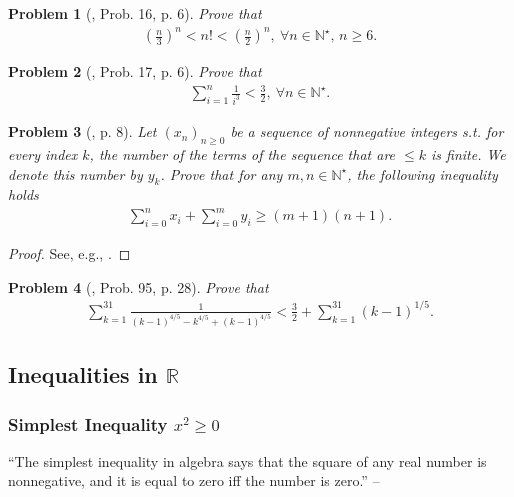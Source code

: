 \documentclass[oneside]{book}
\numberwithin{equation}{section}
\newtheorem{problem}{Problem}[section]
\begin{document}
\begin{problem}[\cite{Gelca_Andreescu2017}, Prob. 16, p. 6]
	Prove that
	\begin{align*}
		\left(\frac{n}{3}\right)^n < n! < \left(\frac{n}{2}\right)^n,\ \forall n\in\mathbb{N}^\star,\,n\ge 6.
	\end{align*}
\end{problem}

\begin{problem}[\cite{Gelca_Andreescu2017}, Prob. 17, p. 6]
	Prove that
	\begin{align*}
		\sum_{i=1}^n \frac{1}{i^3} < \frac{3}{2},\ \forall n\in\mathbb{N}^\star.
	\end{align*}
\end{problem}

\begin{problem}[\cite{Gelca_Andreescu2017}, p. 8]
	Let $(x_n)_{n\ge 0}$ be a sequence of nonnegative integers s.t. for every index $k$, the number of the terms of the sequence that are $\le k$ is finite. We denote this number by $y_k$. Prove that for any $m,n\in\mathbb{N}^\star$, the following inequality holds
	\begin{align*}
		\sum_{i=0}^n x_i + \sum_{i=0}^m y_i\ge(m + 1)(n + 1).
	\end{align*}
\end{problem}

\begin{proof}[Proof]
	See, e.g., \cite[pp. 8--9]{Gelca_Andreescu2017}.
\end{proof}

\begin{problem}[\cite{Gelca_Andreescu2017}, Prob. 95, p. 28]
	Prove that
	\begin{align}
		\sum_{k=1}^{31} \frac{1}{(k - 1)^{4/5} - k^{4/5} + (k - 1)^{4/5}} < \frac{3}{2} + \sum_{k=1}^{31} (k - 1)^{1/5}.
	\end{align}
\end{problem}

\subsection{Inequalities in $\mathbb{R}$}

\subsubsection{Simplest Inequality $x^2\ge 0$}
``The simplest inequality in algebra says that the square of any real number is nonnegative, and it is equal to zero iff the number is zero.'' -- \cite[Subsect. 2.1.2, p. 28]{Gelca_Andreescu2017}
\end{document}
